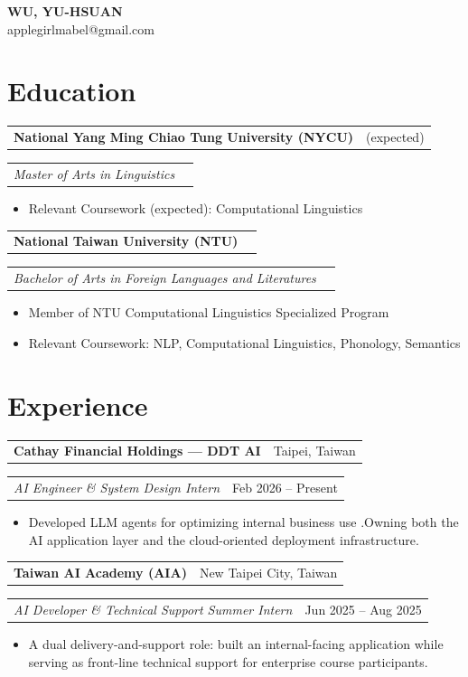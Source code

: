 \documentclass[11pt,a4paper]{article}
\makeatletter
\newcommand{\entryhead}[2]{%
  \begin{tabularx}{\linewidth}{@{}Xr@{}}
    \textbf{\fontsize{10.5pt}{13pt}\selectfont #1} &
    {\color{inkmuted}\fontsize{9.5pt}{12pt}\selectfont #2}
  \end{tabularx}%
}
\newcommand{\entrysub}[2]{%
  \begin{tabularx}{\linewidth}{@{}Xr@{}}
    {\color{inkmuted}\itshape \fontsize{9.5pt}{12pt}\selectfont #1} &
    {\color{inkmuted}\fontsize{9.5pt}{12pt}\selectfont #2}
  \end{tabularx}%
}
\makeatother
\begin{document}
\begin{center}
  {\sffamily\bfseries\fontsize{17pt}{20pt}\selectfont
   WU, YU-HSUAN}\\[1.2mm]
  {\color{inkmuted}\fontsize{9pt}{11pt}\selectfont
   applegirlmabel@gmail.com}
\end{center}

\section{Education}
\entryhead{National Yang Ming Chiao Tung University (NYCU)}{2028 (expected)}
\entrysub{Master of Arts in Linguistics}{}
\begin{itemize}
  \item Relevant Coursework (expected): Computational Linguistics
\end{itemize}
\vspace{2.6mm}\entryhead{National Taiwan University (NTU)}{2026}
\entrysub{Bachelor of Arts in Foreign Languages and Literatures}{}
\begin{itemize}
  \item Member of NTU Computational Linguistics Specialized Program
  \item Relevant Coursework: NLP, Computational Linguistics, Phonology, Semantics
\end{itemize}

\section{Experience}
\entryhead{Cathay Financial Holdings — DDT AI}{Taipei, Taiwan}
\entrysub{AI Engineer \& System Design Intern}{Feb 2026 – Present}
\begin{itemize}
  \item Developed LLM agents for optimizing internal business use .Owning both the AI
application layer and the cloud-oriented deployment infrastructure.
\end{itemize}
\vspace{2.6mm}\entryhead{Taiwan AI Academy (AIA)}{New Taipei City, Taiwan}
\entrysub{AI Developer \& Technical Support Summer Intern}{Jun 2025 – Aug 2025}
\begin{itemize}
  \item A dual delivery-and-support role: built an internal-facing application while serving as front-line technical support for enterprise course participants.
\end{itemize}
\end{document}
